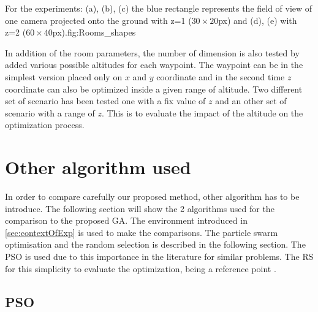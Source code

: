  
 \begin{mfigures}[!]{For the experiments: (a), (b), (c) the blue rectangle represents the field of view of one camera projected onto the ground  with z=1 ($30 \times 20 $px) and (d), (e) with z=2 ($60 \times 40 $px).}{fig:Rooms_shapes} \centering
{}
\hspace{1cm}
\hspace{1cm}
\end{mfigures} 

 In addition of the room parameters, the number of dimension is also tested by  added various possible altitudes for each waypoint. The waypoint can be in the simplest version placed only on $x$ and $y$ coordinate and in the second time $z$ coordinate can also be optimized inside a given range of altitude. 
 Two different set of scenario has been tested one with a fix value of $z$ and  an other set of scenario with a range of $z$.  This is to evaluate the impact of the altitude on the optimization process.



\section{Other algorithm used}

In order to compare carefully our proposed method, other algorithm has to be introduce. The following section will show the 2 algorithms used for the comparison to the proposed GA. The environment introduced in \ref{sec:contextOfExp} is used to make the comparisons.  
The particle swarm optimisation and the random selection is described in the following section. The PSO is used due to this importance in the literature for similar problems. The RS for this simplicity to evaluate the optimization, being a reference point .  

\subsection{PSO }

